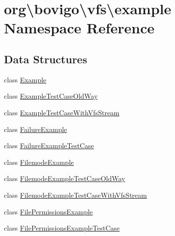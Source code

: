 \hypertarget{namespaceorg_1_1bovigo_1_1vfs_1_1example}{}\section{org\textbackslash{}bovigo\textbackslash{}vfs\textbackslash{}example Namespace Reference}
\label{namespaceorg_1_1bovigo_1_1vfs_1_1example}
\subsection*{Data Structures}
\begin{DoxyCompactItemize}
\item 
class \mbox{\hyperlink{classorg_1_1bovigo_1_1vfs_1_1example_1_1_example}{Example}}
\item 
class \mbox{\hyperlink{classorg_1_1bovigo_1_1vfs_1_1example_1_1_example_test_case_old_way}{Example\+Test\+Case\+Old\+Way}}
\item 
class \mbox{\hyperlink{classorg_1_1bovigo_1_1vfs_1_1example_1_1_example_test_case_with_vfs_stream}{Example\+Test\+Case\+With\+Vfs\+Stream}}
\item 
class \mbox{\hyperlink{classorg_1_1bovigo_1_1vfs_1_1example_1_1_failure_example}{Failure\+Example}}
\item 
class \mbox{\hyperlink{classorg_1_1bovigo_1_1vfs_1_1example_1_1_failure_example_test_case}{Failure\+Example\+Test\+Case}}
\item 
class \mbox{\hyperlink{classorg_1_1bovigo_1_1vfs_1_1example_1_1_filemode_example}{Filemode\+Example}}
\item 
class \mbox{\hyperlink{classorg_1_1bovigo_1_1vfs_1_1example_1_1_filemode_example_test_case_old_way}{Filemode\+Example\+Test\+Case\+Old\+Way}}
\item 
class \mbox{\hyperlink{classorg_1_1bovigo_1_1vfs_1_1example_1_1_filemode_example_test_case_with_vfs_stream}{Filemode\+Example\+Test\+Case\+With\+Vfs\+Stream}}
\item 
class \mbox{\hyperlink{classorg_1_1bovigo_1_1vfs_1_1example_1_1_file_permissions_example}{File\+Permissions\+Example}}
\item 
class \mbox{\hyperlink{classorg_1_1bovigo_1_1vfs_1_1example_1_1_file_permissions_example_test_case}{File\+Permissions\+Example\+Test\+Case}}
\end{DoxyCompactItemize}
